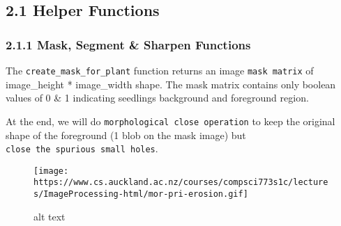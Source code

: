 \documentclass[11pt]{article}
\makeatletter
\def\maxwidth{\ifdim\Gin@nat@width>\linewidth\linewidth
    \else\Gin@nat@width\fi}
\let\Oldincludegraphics\includegraphics
\renewcommand{\includegraphics}[1]{\Oldincludegraphics[width=.8\maxwidth]{#1}}
\makeatother
\begin{document}
    \hypertarget{helper-functions}{%
\subsection{2.1 Helper Functions}\label{helper-functions}}

    \hypertarget{mask-segment-sharpen-functions}{%
\subsubsection{2.1.1 Mask, Segment \& Sharpen
Functions}\label{mask-segment-sharpen-functions}}

    The \texttt{create\_mask\_for\_plant} function returns an image
\texttt{mask\ matrix} of image\_height * image\_width shape. The mask
matrix contains only boolean values of 0 \& 1 indicating seedlings
background and foreground region.

At the end, we will do \texttt{morphological\ close\ operation} to keep
the original shape of the foreground (1 blob on the mask image) but
\texttt{close\ the\ spurious\ small\ holes}.

\begin{figure}
\centering
\texttt{[image: https://www.cs.auckland.ac.nz/courses/compsci773s1c/lectures/ImageProcessing-html/mor-pri-erosion.gif]}
\caption{alt text}
\end{figure}
\end{document}
